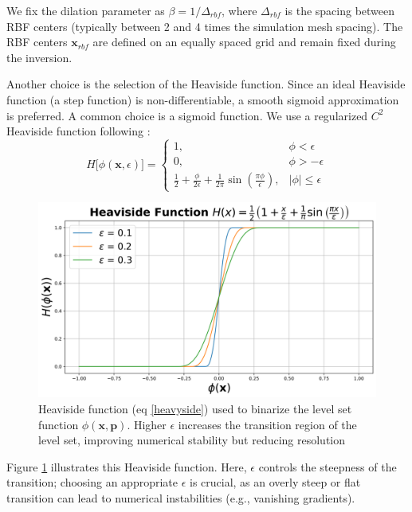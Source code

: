 \documentclass{segabs}
\begin{document}
We fix the dilation parameter as $\beta = 1/\Delta_{rbf}$, where $\Delta_{rbf}$ is the spacing between RBF centers (typically between 2 and 4 times the simulation mesh spacing). The RBF centers $\mathbf{x}_{rbf}$ are defined on an equally spaced grid and remain fixed during the inversion.

Another choice is the selection of the Heaviside function. Since an ideal Heaviside function (a step function) is non-differentiable, a smooth sigmoid approximation is preferred. A common choice is a sigmoid function. We use a regularized ${C^2}$ Heaviside function following \cite{aghasi_parametric_2011}:
\begin{equation}\label{heavyside}
H\big[\phi(\mathbf{x},\epsilon)\big] = \begin{cases}
	1, & \phi<\epsilon \\
	0, & \phi>-\epsilon\\
        \frac{1}{2} + \frac{\phi}{2\epsilon}+ \frac{1}{2\pi}\sin(\frac{\pi \phi}{\epsilon}), & |\phi| \leq \epsilon
\end{cases}
\end{equation}

\begin{figure}[h]
    \centering
    \includegraphics[width=\columnwidth]{figures/heaviside.png}
    \caption{Heaviside function (eq \ref{heavyside}) used to binarize the level set function $\phi(\mathbf{x}, \mathbf{p})$. Higher $\epsilon$ increases the transition region of the level set, improving numerical stability but reducing resolution}
    \label{fig:heaviside}
\end{figure}

Figure \ref{fig:heaviside} illustrates this Heaviside function. Here, $\epsilon$ controls the steepness of the transition; choosing an appropriate $\epsilon$ is crucial, as an overly steep or flat transition can lead to numerical instabilities (e.g., vanishing gradients).
\end{document}
